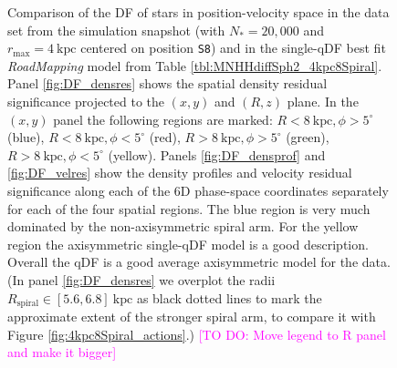 \documentclass[iop,revtex4,numberedappendix,appendixfloats]{emulateapj}
\newcommand{\RM}{{\sl RoadMapping}}
\newcommand{\Wilma}[1]{\textcolor{Magenta}{#1}}
\begin{document}
\begin{figure}[!htbp]
  \caption{Comparison of the DF of stars in position-velocity space in the data set from the simulation snapshot (with $N_*=20,000$ and $r_\text{max}=4~\text{kpc}$ centered on position \texttt{S8}) and in the single-qDF best fit \RM{} model from Table \ref{tbl:MNHHdiffSph2_4kpc8Spiral}. Panel \ref{fig:DF_densres} shows the spatial density residual significance projected to the $(x,y)$ and $(R,z)$ plane. In the $(x,y)$ panel the following regions are marked: $R<8~\text{kpc},\phi>5^\circ$ (blue), $R<8~\text{kpc},\phi<5^\circ$ (red), $R>8~\text{kpc},\phi>5^\circ$ (green), $R>8~\text{kpc},\phi<5^\circ$ (yellow). Panels \ref{fig:DF_densprof} and \ref{fig:DF_velres} show the density profiles and velocity residual significance along each of the 6D phase-space coordinates separately for each of the four spatial regions. The blue region is very much dominated by the non-axisymmetric spiral arm. For the yellow region the axisymmetric single-qDF model is a good description. Overall the qDF is a good average axisymmetric model for the data. (In panel \ref{fig:DF_densres} we overplot the radii $R_\text{spiral} \in [5.6,6.8]~\text{kpc}$ as black dotted lines to mark the approximate extent of the stronger spiral arm, to compare it with Figure \ref{fig:4kpc8Spiral_actions}.) \Wilma{[TO DO: Move legend to R panel and make it bigger]}}
  \label{fig:4kpc8Spiral_DF_comparison}
\end{figure}
\end{document}
